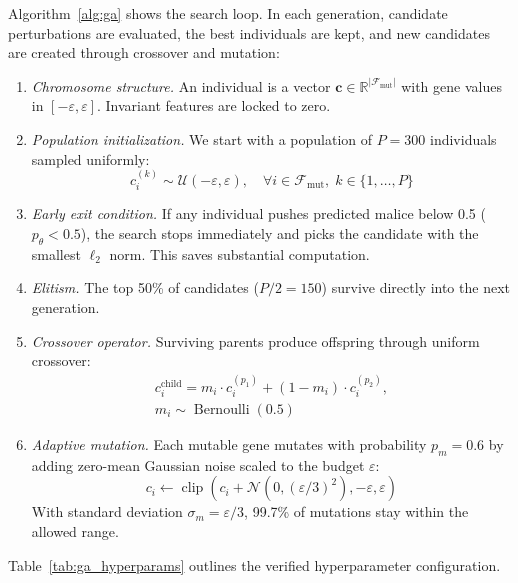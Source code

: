 \documentclass[iicol,pdflatex,sn-mathphys-num]{sn-jnl}
\begin{document}
Algorithm~\ref{alg:ga} shows the search loop. In each generation, candidate perturbations are evaluated, the best individuals are kept, and new candidates are created through crossover and mutation:
\begin{enumerate}
    \item \textit{Chromosome structure.} An individual is a vector $\mathbf{c} \in \mathbb{R}^{|\mathcal{F}_{\text{mut}}|}$ with gene values in $[-\varepsilon, \varepsilon]$. Invariant features are locked to zero.
    \item \textit{Population initialization.} We start with a population of $P=300$ individuals sampled uniformly:
    \begin{equation}
        c^{(k)}_i \sim \mathcal{U}(-\varepsilon, \varepsilon), \quad \forall i \in \mathcal{F}_{\text{mut}}, \; k \in \{1, \dots, P\}
    \end{equation}
    \item \textit{Early exit condition.} If any individual pushes predicted malice below 0.5 ($p_\theta < 0.5$), the search stops immediately and picks the candidate with the smallest $\ell_2$ norm. This saves substantial computation.
    \item \textit{Elitism.} The top 50\% of candidates ($P/2 = 150$) survive directly into the next generation.
    \item \textit{Crossover operator.} Surviving parents produce offspring through uniform crossover:
    \begin{multline}
        c^{\text{child}}_i = m_i \cdot c^{(p_1)}_i + (1 - m_i) \cdot c^{(p_2)}_i,\\
        m_i \sim \operatorname{Bernoulli}(0.5)
    \end{multline}
    \item \textit{Adaptive mutation.} Each mutable gene mutates with probability $p_m = 0.6$ by adding zero-mean Gaussian noise scaled to the budget $\varepsilon$:
    \begin{equation}
        c_i \leftarrow \operatorname{clip}\left(c_i + \mathcal{N}\left(0, (\varepsilon/3)^2\right), -\varepsilon, \varepsilon\right)
    \end{equation}
    With standard deviation $\sigma_m = \varepsilon/3$, 99.7\% of mutations stay within the allowed range.
\end{enumerate}

Table~\ref{tab:ga_hyperparams} outlines the verified hyperparameter configuration.
\end{document}
